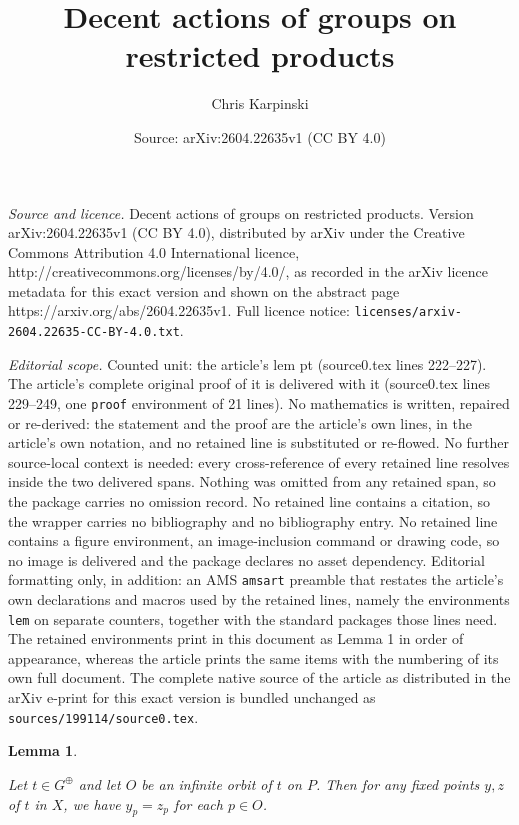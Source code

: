 \documentclass[10pt,a4paper]{amsart}
\title{Decent actions of groups on restricted products}
\author{Chris Karpinski}
\date{Source: arXiv:2604.22635v1 (CC BY 4.0)}
\newtheorem{lem}{Lemma}
\begin{document}
\maketitle

\noindent\emph{Source and licence.} Decent actions of groups on restricted products. Version arXiv:2604.22635v1 (CC BY 4.0), distributed by arXiv under the Creative Commons Attribution 4.0 International licence, http://creativecommons.org/licenses/by/4.0/, as recorded in the arXiv licence metadata for this exact version and shown on the abstract page https://arxiv.org/abs/2604.22635v1. Full licence notice: \texttt{licenses/arxiv-2604.22635-CC-BY-4.0.txt}.\par\smallskip

\noindent\textit{Editorial scope.} Counted unit: the article's lem pt (source0.tex lines 222--227). The article's complete original proof of it is delivered with it (source0.tex lines 229--249, one \texttt{proof} environment of 21 lines). No mathematics is written, repaired or re-derived: the statement and the proof are the article's own lines, in the article's own notation, and no retained line is substituted or re-flowed.  No further source-local context is needed: every cross-reference of every retained line resolves inside the two delivered spans.  Nothing was omitted from any retained span, so the package carries no omission record.  No retained line contains a citation, so the wrapper carries no bibliography and no bibliography entry.  No retained line contains a figure environment, an image-inclusion command or drawing code, so no image is delivered and the package declares no asset dependency.  Editorial formatting only, in addition: an AMS \texttt{amsart} preamble that restates the article's own declarations and macros used by the retained lines, namely the environments \texttt{lem} on separate counters, together with the standard packages those lines need.  The retained environments print in this document as Lemma 1 in order of appearance, whereas the article prints the same items with the numbering of its own full document.  The complete native source of the article as distributed in the arXiv e-print for this exact version is bundled unchanged as \texttt{sources/199114/source0.tex}.
\begin{lem}
    \label{Inf orb fix pt}

    Let $t \in G^{\oplus}$ and let $O$ be an infinite orbit of $t$ on $P$. Then for any fixed points $y,z$ of $t$ in $X$, we have $y_p = z_p$ for each $p \in O$. 
    
\end{lem}
\end{document}
